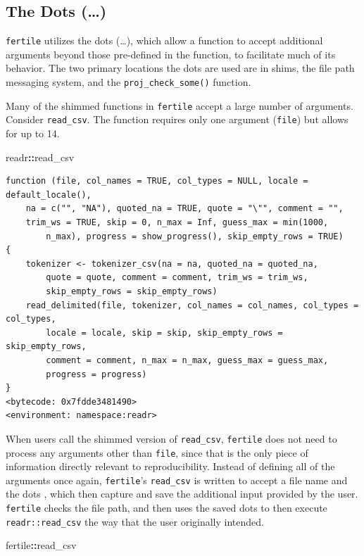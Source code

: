 \documentclass[12pt,twoside]{reedthesis}
\newenvironment{Shaded}{\begin{snugshade}}{\end{snugshade}}
\newcommand{\NormalTok}[1]{#1}
\newcommand{\OperatorTok}[1]{\textcolor[rgb]{0.81,0.36,0.00}{\textbf{#1}}}
\begin{document}
\hypertarget{the-dots}{%
\subsection{The Dots (\ldots)}\label{the-dots}}

\texttt{fertile} utilizes the dots (\ldots), which allow a function to accept additional arguments beyond those pre-defined in the function, to facilitate much of its behavior. The two primary locations the dots are used are in shims, the file path messaging system, and the \texttt{proj\_check\_some()} function.

Many of the shimmed functions in \texttt{fertile} accept a large number of arguments. Consider \texttt{read\_csv}. The function requires only one argument (\texttt{file}) but allows for up to 14.
\begin{Shaded}
\begin{Highlighting}[]
\NormalTok{readr}\OperatorTok{::}\NormalTok{read_csv}
\end{Highlighting}
\end{Shaded}
\begin{verbatim}
function (file, col_names = TRUE, col_types = NULL, locale = default_locale(), 
    na = c("", "NA"), quoted_na = TRUE, quote = "\"", comment = "", 
    trim_ws = TRUE, skip = 0, n_max = Inf, guess_max = min(1000, 
        n_max), progress = show_progress(), skip_empty_rows = TRUE) 
{
    tokenizer <- tokenizer_csv(na = na, quoted_na = quoted_na, 
        quote = quote, comment = comment, trim_ws = trim_ws, 
        skip_empty_rows = skip_empty_rows)
    read_delimited(file, tokenizer, col_names = col_names, col_types = col_types, 
        locale = locale, skip = skip, skip_empty_rows = skip_empty_rows, 
        comment = comment, n_max = n_max, guess_max = guess_max, 
        progress = progress)
}
<bytecode: 0x7fdde3481490>
<environment: namespace:readr>
\end{verbatim}
When users call the shimmed version of \texttt{read\_csv}, \texttt{fertile} does not need to process any arguments other than \texttt{file}, since that is the only piece of information directly relevant to reproducibility. Instead of defining all of the arguments once again, \texttt{fertile}'s \texttt{read\_csv} is written to accept a file name and the dots , which then capture and save the additional input provided by the user. \texttt{fertile} checks the file path, and then uses the saved dots to then execute \texttt{readr::read\_csv} the way that the user originally intended.
\begin{Shaded}
\begin{Highlighting}[]
\NormalTok{fertile}\OperatorTok{::}\NormalTok{read_csv}
\end{Highlighting}
\end{Shaded}
\end{document}
